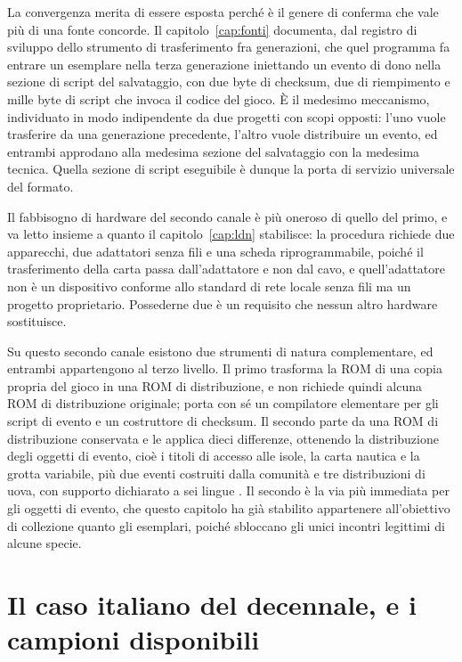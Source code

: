 La convergenza merita di essere esposta perché è il genere di conferma che vale più di una fonte concorde. Il capitolo~\ref{cap:fonti} documenta, dal registro di sviluppo dello strumento di trasferimento fra generazioni, che quel programma fa entrare un esemplare nella terza generazione iniettando un evento di dono nella sezione di script del salvataggio, con due byte di checksum, due di riempimento e mille byte di script che invoca il codice del gioco. È il medesimo meccanismo, individuato in modo indipendente da due progetti con scopi opposti: l'uno vuole trasferire da una generazione precedente, l'altro vuole distribuire un evento, ed entrambi approdano alla medesima sezione del salvataggio con la medesima tecnica. Quella sezione di script eseguibile è dunque la porta di servizio universale del formato.

Il fabbisogno di hardware del secondo canale è più oneroso di quello del primo, e va letto insieme a quanto il capitolo~\ref{cap:ldn} stabilisce: la procedura richiede due apparecchi, due adattatori senza fili e una scheda riprogrammabile, poiché il trasferimento della carta passa dall'adattatore e non dal cavo, e quell'adattatore non è un dispositivo conforme allo standard di rete locale senza fili ma un progetto proprietario. Possederne due è un requisito che nessun altro hardware sostituisce.

Su questo secondo canale esistono due strumenti di natura complementare, ed entrambi appartengono al terzo livello. Il primo trasforma la ROM di una copia propria del gioco in una ROM di distribuzione, e non richiede quindi alcuna ROM di distribuzione originale; porta con sé un compilatore elementare per gli script di evento e un costruttore di checksum. Il secondo parte da una ROM di distribuzione conservata e le applica dieci differenze, ottenendo la distribuzione degli oggetti di evento, cioè i titoli di accesso alle isole, la carta nautica e la grotta variabile, più due eventi costruiti dalla comunità e tre distribuzioni di uova, con supporto dichiarato a sei lingue \cite{project-wonder}. Il secondo è la via più immediata per gli oggetti di evento, che questo capitolo ha già stabilito appartenere all'obiettivo di collezione quanto gli esemplari, poiché sbloccano gli unici incontri legittimi di alcune specie.

\section{Il caso italiano del decennale, e i campioni disponibili}


